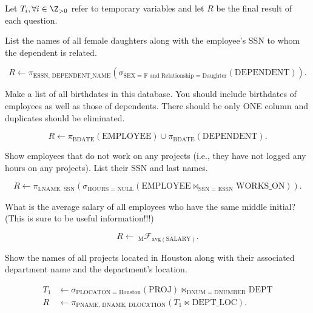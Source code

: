 \documentclass[
  coursecode={CMPE 332},
  assignmentname={Relational Algebra Assignment},
  studentnumber=20053722,
  name={Bryan Hoang},
  draft,
]{
  ltxanswer%
}
\begin{document}
  \noindent Let \(T_{i}, \forall i \in \Z_{>0}\) refer to temporary variables and let \(R\) be the final result of each question.
  \begin{questions}
    \question[2] List the names of all female daughters along with the employee's SSN to whom the dependent is related.
    \begin{solution}
      \begin{equation*}
        R \leftarrow \pi_{\text{ESSN, DEPENDENT\_NAME}}(\sigma_{\text{SEX = F and Relationship = Daughter}}(\text{DEPENDENT})).
      \end{equation*}
    \end{solution}

    \question[2] Make a list of all birthdates in this database. You should include birthdates of employees as well as those of dependents. There should be only ONE column and duplicates should be eliminated.
    \begin{solution}
      \begin{equation*}
        R \leftarrow \pi_{\text{BDATE}}(\text{EMPLOYEE}) \cup \pi_{\text{BDATE}}(\text{DEPENDENT}).
      \end{equation*}
    \end{solution}

    \question[2] Show employees that do not work on any projects (i.e., they have not logged any hours on any projects).  List their SSN and last names.
    \begin{solution}
      \begin{equation*}
        R \leftarrow \pi_{\text{LNAME, SSN}}(\sigma_{\text{HOURS = NULL}}(\text{EMPLOYEE} \bowtie_{\text{SSN = ESSN}} \text{WORKS\_ON})).
      \end{equation*}
    \end{solution}

    \question[2] What is the average salary of all employees who have the same middle initial? (This is sure to be useful information!!!)
    \begin{solution}
      \begin{equation*}
        R \leftarrow\ _{\text{M}} \mathcal{F}_{\mathrm{avg}(\text{SALARY})}.
      \end{equation*}
    \end{solution}

    \question[2] Show the names of all projects  located in Houston along with their associated department name and the department's location.
    \begin{solution}
      \begin{align*}
        T_{1} &\leftarrow \sigma_{\text{PLOCATON = Houston}}(\text{PROJ}) \bowtie_{\text{DNUM = DNUMBER}} \text{DEPT} \\
        R     &\leftarrow \pi_{\text{PNAME, DNAME, DLOCATION}}(T_{1} \bowtie \text{DEPT\_LOC}).
      \end{align*}
    \end{solution}


\end{questions}
\end{document}
